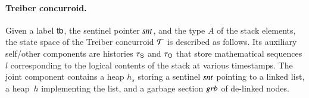 \newcommand{\tbinv}{I}

\paragraph{Treiber concurroid.}
Given a label $\mathsf{tb}$, the sentinel pointer $\mathit{snt}$, and the type $A$
of the stack elements, the state space of the Treiber concurroid
$\mathcal{T}$ is described as follows. Its auxiliary self/other components
are histories $\tau_{\mathsf{S}}$ and $\tau_{\mathsf{O}}$ that store mathematical sequences
$l$ corresponding to the logical contents of the stack at various
timestamps. The joint component contains a heap $h_s$ storing a
sentinel $\mathit{snt}$ pointing to a linked list, a heap~$h$ implementing
the list, and a garbage section $\mathit{grb}$ of de-linked nodes.
%
%
%

